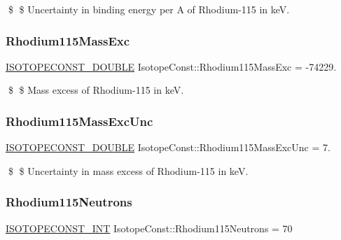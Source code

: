 \$ \$ Uncertainty in binding energy per A of Rhodium-\/115 in keV. \mbox{\label{group___isotope_const-_rhodium-_rh115_ga742dd497e6997c59363d12f655ac8c6b}} 
\subsubsection{\texorpdfstring{Rhodium115\+Mass\+Exc}{Rhodium115MassExc}}
{\footnotesize\ttfamily \mbox{\hyperlink{group___isotope_const-_macros_ga8f45a7272ce02c0b4c65c44636ed719a}{I\+S\+O\+T\+O\+P\+E\+C\+O\+N\+S\+T\+\_\+\+D\+O\+U\+B\+LE}} Isotope\+Const\+::\+Rhodium115\+Mass\+Exc = -\/74229.}

\$ \$ Mass excess of Rhodium-\/115 in keV. \mbox{\label{group___isotope_const-_rhodium-_rh115_ga2319c0f500044e31920debcb0d0c05d4}} 
\subsubsection{\texorpdfstring{Rhodium115\+Mass\+Exc\+Unc}{Rhodium115MassExcUnc}}
{\footnotesize\ttfamily \mbox{\hyperlink{group___isotope_const-_macros_ga8f45a7272ce02c0b4c65c44636ed719a}{I\+S\+O\+T\+O\+P\+E\+C\+O\+N\+S\+T\+\_\+\+D\+O\+U\+B\+LE}} Isotope\+Const\+::\+Rhodium115\+Mass\+Exc\+Unc = 7.}

\$ \$ Uncertainty in mass excess of Rhodium-\/115 in keV. \mbox{\label{group___isotope_const-_rhodium-_rh115_ga580a95dd13c7482d8db42a28c6208846}} 
\subsubsection{\texorpdfstring{Rhodium115\+Neutrons}{Rhodium115Neutrons}}
{\footnotesize\ttfamily \mbox{\hyperlink{group___isotope_const-_macros_ga5f18360b3e99483a35c32d789e62621c}{I\+S\+O\+T\+O\+P\+E\+C\+O\+N\+S\+T\+\_\+\+I\+NT}} Isotope\+Const\+::\+Rhodium115\+Neutrons = 70}

